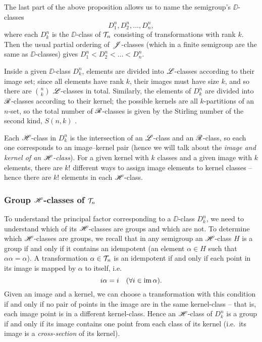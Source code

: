 The last part of the above proposition allows us to name the semigroup's
$\DD$-classes $$D_1^n, D_2^n, \dots, D_n^n,$$ where each $D_k^n$ is the
$\DD$-class of $\mathcal{T}_n$ consisting of transformations with rank $k$.  Then the
usual partial ordering of $\mathrel{\mathscr{J}}$-classes (which in a finite semigroup are the
same as $\DD$-classes) gives $D_1^n < D_2^n < \dots < D_n^n$.

Inside a given $\DD$-class $D_k^n$, elements are divided into $\mathrel{\mathscr{L}}$-classes
according to their image set; since all elements have rank $k$, their images
must have size $k$, and so there are $\binom{n}{k}$ $\mathrel{\mathscr{L}}$-classes in total.
Similarly, the elements of $D_k^n$ are divided into $\mathrel{\mathscr{R}}$-classes according to
their kernel; the possible kernels are all $k$-partitions of an $n$-set, so the
total number of $\mathrel{\mathscr{R}}$-classes is given by the Stirling number of the second
kind, $S(n,k)$ .

Each $\mathrel{\mathscr{H}}$-class in $D_k^n$ is the intersection of an $\mathrel{\mathscr{L}}$-class and an
$\mathrel{\mathscr{R}}$-class, so each one corresponds to an image--kernel pair (hence we will talk
about the \textit{image and kernel of an $\mathrel{\mathscr{H}}$-class}).  For a given kernel with
$k$ classes and a given image with $k$ elements, there are $k!$ different ways
to assign image elements to kernel classes -- hence there are $k!$ elements in each $\mathrel{\mathscr{H}}$-class.

\subsubsection{Group $\mathrel{\mathscr{H}}$-classes of $\mathcal{T}_n$}
To understand the principal factor corresponding to a $\DD$-class $D_k^n$, we need
to understand which of its $\mathrel{\mathscr{H}}$-classes are groups and which are not.  To
determine which $\mathrel{\mathscr{H}}$-classes are groups, we recall that in any semigroup an
$\mathrel{\mathscr{H}}$-class $H$ is a group if and only if it contains an idempotent (an element
$\alpha \in H$ such that $\alpha \alpha = \alpha$).  A transformation
$\alpha \in \mathcal{T}_n$ is an idempotent if and only if each point in its image is
mapped by $\alpha$ to itself, i.e.
$$i \alpha = i \quad (\forall i \in \operatorname{im} \alpha).$$
Given an image and a kernel, we can choose a transformation with this condition
if and only if no pair of points in the image are in the same
kernel-class -- that is, each image point is in a different kernel-class.  Hence
an $\mathrel{\mathscr{H}}$-class of $D_k^n$ is a group if and only if its image contains one point
from each class of its kernel (i.e.~its image is a \textit{cross-section} of its
kernel).  

